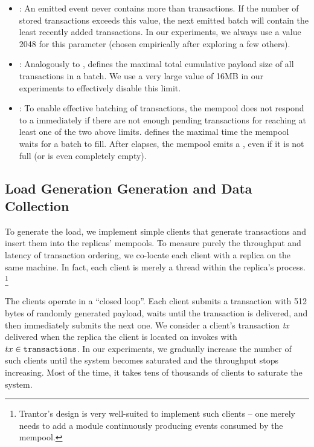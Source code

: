 \documentclass{article}
\begin{document}
\begin{itemize}
    
    \item {}: An emitted  event never contains more than  transactions.
    If the number of stored transactions exceeds this value, the next emitted batch will contain the  least recently added transactions.
    In our experiments, we always use a value 2048 for this parameter (chosen empirically after exploring a few others).
    
    \item {}: Analogously to ,
     defines the maximal total cumulative payload size of all transactions in a batch.
    We use a very large value of 16MB in our experiments to effectively disable this limit.
    
    \item {}: To enable effective batching of transactions, the mempool does not respond to a  immediately
    if there are not enough pending transactions for reaching at least one of the two above limits.
     defines the maximal time the mempool waits for a batch to fill.
    After  elapses, the mempool emits a , even if it is not full (or is even completely empty).
\end{itemize}

\subsection{Load Generation Generation and Data Collection}

To generate the load, we implement simple clients that generate transactions and insert them into the replicas' mempools.
To measure purely the throughput and latency of transaction ordering, we co-locate each client with a replica on the same machine.
In fact, each client is merely a thread within the replica's process.%
\footnote{Trantor's design is very well-suited to implement such clients --
one merely needs to add a module continuously producing  events consumed by the mempool.}

The clients operate in a “closed loop”.
Each client submits a transaction with 512 bytes of randomly generated payload, waits until the transaction is delivered, and then immediately submits the next one.
We consider a client's transaction \textit{tx} delivered when the replica the client is located on invokes  with $tx \in \texttt{transactions}$.
In our experiments, we gradually increase the number of such clients until the system becomes saturated and the throughput stops increasing.
Most of the time, it takes tens of thousands of clients to saturate the system.
\end{document}
